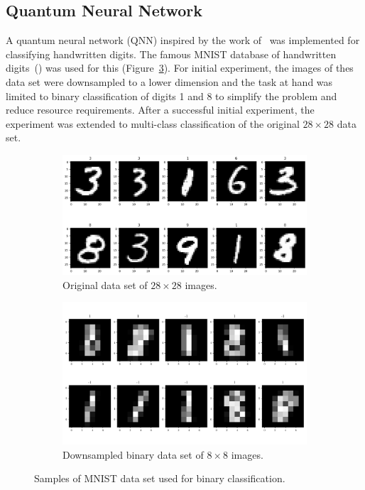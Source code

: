\documentclass[a4paper,10pt]{article}
\begin{document}
\subsection{Quantum Neural Network}
A quantum neural network (QNN) inspired by the work of~\cite{qnn-near-term} was implemented for classifying handwritten digits.
The famous MNIST database of handwritten digits~(\cite{mnist-digits}) was used for this (Figure~\ref{fig:mnist}).
For initial experiment, the images of thes data set were downsampled to a lower dimension and the task at hand was limited to binary classification of digits 1 and 8 to simplify the problem and reduce resource requirements.
After a successful initial experiment, the experiment was extended to multi-class classification of the original $28 \times 28$ data set.
\begin{figure}[ht]
	\centering
	\begin{subfigure}{.5\textwidth}
		\centering
		\includegraphics[width=.925\linewidth]{figures/mnist_28x28.png}
		\caption{Original data set of $28 \times 28$ images.}
		\label{fig:mnist_28x28}
	\end{subfigure}%
	\begin{subfigure}{.5\textwidth}
		\centering
		\includegraphics[width=.925\linewidth]{figures/mnist_8x8}
		\caption{Downsampled binary data set of $8 \times 8$ images.}
		\label{fig:mnist_8x8}
	\end{subfigure}
	\caption{Samples of MNIST data set used for binary classification.}
	\label{fig:mnist}
\end{figure}
\end{document}

